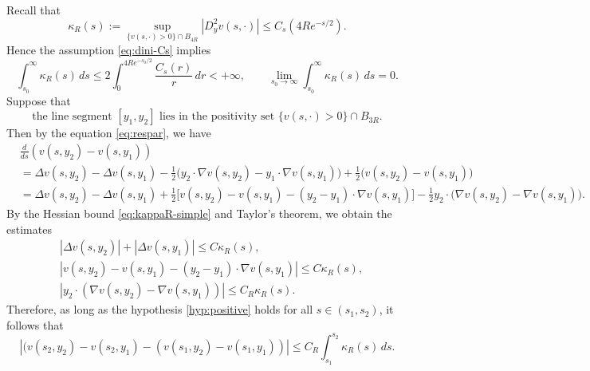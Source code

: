\documentclass[11pt]{article}
\numberwithin{equation}{section}
\theoremstyle{definition}
\begin{document}
Recall that
\begin{equation}\label{eq:kappaR-simple}
    \kappa_R(s):=\sup_{\{v(s,\cdot)>0\}\cap B_{4R}} |D_y^2v(s,\cdot)| \leq C_s(4Re^{-s/2}).
\end{equation}
Hence the assumption \eqref{eq:dini-Cs} implies 
\begin{equation}\label{eq:kappa-dini-simple}
    \int_{s_0}^\infty \kappa_R(s)\,ds
    \leq 2\int_0^{4Re^{-s_0/2}}\frac{C_s(r)}{r}\,dr<+\infty,
    \qquad
    \lim_{s_0 \to\infty}\int_{s_0}^\infty \kappa_R(s)\,ds=0.
\end{equation}
Suppose that
\begin{equation}\label{hyp:positive}
    \text{the line segment $[y_1,y_2]$ lies in the positivity set $\{v(s,\cdot)>0\}\cap B_{3R}$}.
\end{equation}
Then by the equation \eqref{eq:respar}, we have
\begin{align*}
 & \frac{d}{ds} \left( v(s,y_2) - v(s,y_1) \right) \\
 & =\Delta v(s, y_2)-\Delta v(s,y_1)
    -\frac12\bigl(y_2\cdot\nabla v(s,y_2)
            - y_1 \cdot\nabla v(s,y_1)\bigr)
        +\frac12\bigl(v(s,y_2)-v(s,y_1)\bigr) \\
  &   =\Delta v(s,y_2)-\Delta v(s,y_1)
    +\frac12\bigl[ v(s,y_2)-v(s,y_1)
            -(y_2-y_1) \cdot\nabla v(s,y_1)\bigr] -\frac12 y_2\cdot
        \bigl(\nabla v(s,y_2)-\nabla v(s,y_1)\bigr).
\end{align*}
By the Hessian bound \eqref{eq:kappaR-simple} and Taylor's theorem, we obtain the estimates
\[
\begin{aligned}
&|\Delta v(s,y_2)|+|\Delta v(s,y_1)|\leq C\kappa_R(s),\\
&\left|
    v(s,y_2)-v(s,y_1)-(y_2 -y_1)\cdot\nabla v(s,y_1)
\right|
    \leq C\kappa_R(s),\\
&\left|
    y_2 \cdot(\nabla v(s,y_2)-\nabla v(s,y_1))
\right|
    \leq C_R\kappa_R(s).
\end{aligned}
\]
Therefore, as long as the hypothesis \eqref{hyp:positive} holds for all $s\in (s_1,s_2)$, it follows that
\begin{equation}\label{eq:spatial-change-v}
    \left|(v(s_2,y_2)-v(s_2,y_1) - (v(s_1,y_2)-v(s_1,y_1) ) \right| \leq C_R \int_{s_1}^{s_2} \kappa_R(s) \, ds.
\end{equation}
\end{document}

